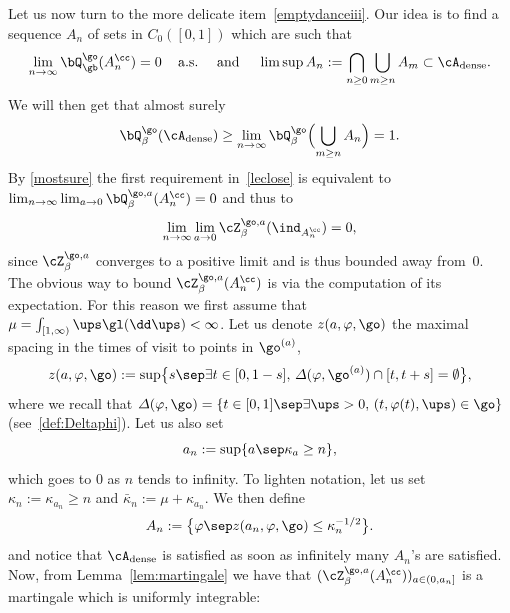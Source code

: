 Let us now turn to the more delicate item~\eqref{emptydanceiii}.
Our idea is to find a sequence $A_{n}$ of sets in $C_0([0,1])$ which are such that
\begin{equation}\label{leclose}
\lim_{n\to\infty} \bQ^{\go}_{\gb}(A_n^{\cc}) =0 \, \quad \text{a.s.} \quad
\text{ and } \quad
\limsup A_{n} := \bigcap_{n\ge 0} \bigcup_{m\ge n} A_m\subset \cA_{\mathrm{dense}}.
\end{equation}
We will then get that almost surely
\begin{equation}
\bQ^{\go}_\beta (\cA_{\mathrm{dense}})\ge \lim_{n\to \infty } \bQ^{\go}_\beta \Bigl(\bigcup_{m\ge n} A_{n}\Bigr)=1.
\end{equation}
By \eqref{mostsure} the first requirement in~\eqref{leclose} is equivalent to
$\lim_{n\to\infty} \lim_{a\to 0} \bQ^{\go,a}_\beta (A^{\cc}_{n}) =0$
and thus to
\begin{equation}
\label{Zan}
\lim_{n\to\infty} \lim_{a\to 0} \cZ^{\go,a}_\beta (\ind_{A^{\cc}_{n}}) =0,
\end{equation}
since $\cZ^{\go,a}_\beta$
converges to a positive limit and is thus bounded away from~$0$.
The obvious way to bound $\cZ^{\go,a}_\beta (A^{\cc}_{n})$ is via the computation of its expectation. For this reason we first assume
that $\mu=\int_{[1,\infty)}\ups \gl (\dd \ups)<\infty$. Let
us denote $z(a,\varphi,\go)$ the maximal spacing in the times of visit to points in $\go^{(a)}$, \ie 
\begin{equation*}
z(a,\varphi,\go):= \sup \bigl\{ s \sep \exists t\in [0,1-s], \, \varDelta(\varphi,\go^{(a)})\cap[t,t+s]=\emptyset\bigr\},
\end{equation*}
where we recall that $\varDelta (\varphi, \go) = \{t\in [0,1] \sep \exists \ups>0,\, (t,\varphi(t),\ups) \in \go\} $ (see~\eqref{def:Deltaphi}).
Let us also set
\begin{equation*}
a_n:= \sup \{ a \sep \kappa_a \ge n \},
\end{equation*}
which goes to $0$ as $n$ tends to infinity.
To lighten notation, let us set $ \kappa_n:= \kappa_{a_n} \geq n$ and $\bar \kappa_n:= \mu+ \kappa_{a_n}$.
We then define
\begin{equation}
A_{n}:= \bigl\{ \varphi \sep z(a_n,\varphi,\go) \le \kappa_n^{-1/2} \bigr\}.
\end{equation}
and notice that $\cA_{\mathrm{dense}}$ is satisfied as soon as infinitely many $A_{n}$'s are satisfied. Now, from Lemma~\ref{lem:martingale} we have that $(\cZ^{\go, a }_{\beta}(A_{n}^{\cc}))_{a\in(0,a_n]}$ is a martingale which is uniformly integrable:
